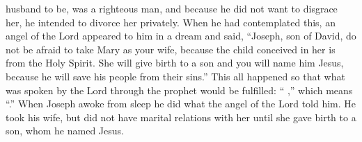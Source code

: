 {husband
to be, was a righteous
man, and
because he did not
want
to disgrace
her,
he intended
to divorce
her
privately.
When he
had contemplated
this,
an angel
of the Lord
appeared
to him
in
a dream
and said,
“Joseph,
son
of David,
do not
be afraid
to take
Mary
as your
wife,
because
the child conceived
in
her
is
from
the Holy
Spirit.
She will give birth
to a son
and
you will name
him
Jesus,
because
he
will save
his
people
from
their
sins.”
This
all
happened
so that
what was spoken
by
the Lord
through
the prophet
would be fulfilled:
“{}
{},” which
means “{}.”
When Joseph
awoke
from
sleep
he did
what
the angel
of the Lord
told
him.
He
took
his
wife,
but
did not
have marital
relations with her
until
she gave birth
to a son,
whom
he named
Jesus.

}
